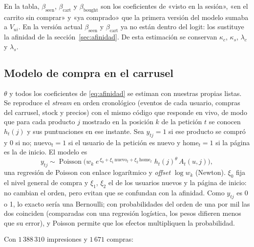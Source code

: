 \documentclass[11pt,a4paper]{article}
\newcommand{\Poi}{\operatorname{Poisson}}
\begin{document}
En la tabla, $\beta_{\text{seen}}$, $\beta_{\text{cart}}$ y $\beta_{\text{bought}}$ son los coeficientes de «visto
en la sesión», «en el carrito sin comprar» y «ya comprado» que la primera versión del modelo sumaba a
$V_{ui}$. En la versión actual $\beta_{\text{seen}}$ y $\beta_{\text{cart}}$ ya no están dentro del logit: los
sustituye la afinidad de la sección~\ref{sec:afinidad}. De esta estimación se conservan $\kappa_c$,
$\kappa_s$, $\lambda_c$ y $\lambda_s$.

\subsection{Modelo de compra en el carrusel}\label{sec:poisson}

$\theta$ y todos los coeficientes de \eqref{eq:afinidad} se estiman con nuestras propias listas. Se
reproduce el \emph{stream} en orden cronológico (eventos de cada usuario, compras del carrusel, stock y
precios) con el mismo código que responde en vivo, de modo que para cada producto $j$ mostrado en la
posición $k$ de la petición $t$ se conocen $h_t(j)$ y sus puntuaciones en ese instante. Sea $y_{tj}=1$ si
ese producto se compró y $0$ si no; $\text{nuevo}_t=1$ si el usuario de la petición es nuevo y
$\text{home}_t=1$ si la página es la de inicio. El modelo es
\begin{equation}
y_{tj}\sim\Poi\Big(w_k\;e^{\,\xi_0+\xi_1\,\text{nuevo}_t+\xi_2\,\text{home}_t}\;h_t(j)^{\theta}\,A_t(u,j)\Big),
\label{eq:poisson}
\end{equation}
una regresión de Poisson con enlace logarítmico y \emph{offset} $\log w_k$ (Newton). $\xi_0$ fija el nivel
general de compra y $\xi_1$, $\xi_2$ el de los usuarios nuevos y la página de inicio: no cambian el orden,
pero evitan que se confundan con la afinidad. Como $y_{tj}$ es 0 o 1, lo exacto sería una Bernoulli; con
probabilidades del orden de una por mil las dos coinciden (comparadas con una regresión logística, los
pesos difieren menos que su error), y Poisson permite que los efectos multipliquen la probabilidad.

Con $1\,388\,310$ impresiones y $1\,671$ compras:
\end{document}

